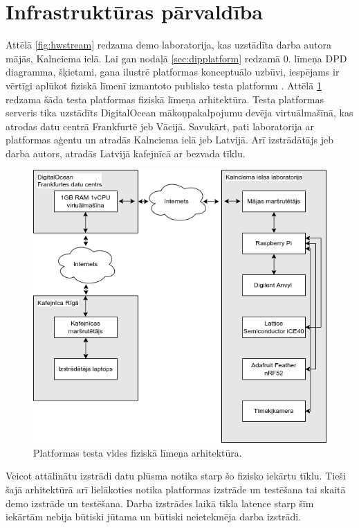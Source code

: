 
\section{Infrastruktūras pārvaldība}
\label{sec:ops}

Attēlā \ref{fig:hwstream} redzama demo laboratorija, kas uzstādīta darba autora
mājās, Kalnciema ielā. Lai gan nodaļā \ref{sec:dipplatform} redzamā 0. līmeņa
DPD diagramma, šķietami, gana ilustrē platformas konceptuālo uzbūvi, iespējams
ir vērtīgi aplūkot fiziskā līmenī izmantoto publisko testa platformu
\cite{VeinbahsKrisjanisProduction}. Attēlā \ref{fig:production} redzama šāda
testa platformas fiziskā līmeņa arhitektūra. Testa platformas serveris tika
uzstādīts DigitalOcean mākoņpakalpojumu devēja virtuālmašīnā, kas atrodas datu
centrā Frankfurtē jeb Vācijā. Savukārt, pati laboratorija ar platformas aģentu
un  atradās Kalnciema ielā jeb Latvijā. Arī
 izstrādātājs jeb darba autors, atradās
Latvijā kafejnīcā ar bezvada tīklu.

\begin{figure}[H]
    \includegraphics[width=0.8\linewidth]{assets/production.drawio.png}
    \centering
    \caption{Platformas testa vides fiziskā līmeņa arhitektūra.}
    \label{fig:production}
\end{figure}

Veicot attālinātu  izstrādi datu plūsma
notika starp šo fizisko iekārtu tīklu. Tieši šajā arhitektūrā arī lielākoties
notika platformas izstrāde un testēšana tai skaitā demo
 izstrāde un testēšana. Darba izstrādes
laikā tīkla latence starp šīm iekārtām nebija būtiski jūtama un būtiski
neietekmēja darba izstrādi.


